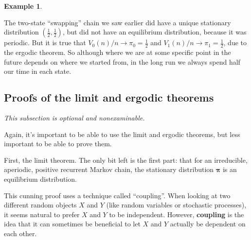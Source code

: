 \documentclass[
  a4paper,
]{article}
\theoremstyle{definition}
\theoremstyle{definition}
\newtheorem{example}{Example}[section]
\theoremstyle{definition}
\theoremstyle{remark}
\begin{document}
\begin{example}
\protect\hypertarget{exm:ergodic-ex2}{}\label{exm:ergodic-ex2}

The two-state ``swapping'' chain we saw earlier did have a unique stationary distribution \((\frac12, \frac12)\), but did not have an equilibrium distribution, because it was periodic. But it is true that \(V_0(n)/n \to \pi_0 = \frac12\) and \(V_1(n)/n \to \pi_1 = \frac12\), due to the ergodic theorem. So although where we are at some specific point in the future depends on where we started from, in the long run we always spend half our time in each state.

\end{example}

\hypertarget{S11-proofs}{%
\subsection{Proofs of the limit and ergodic theorems}\label{S11-proofs}}

\emph{This subsection is optional and nonexaminable.}

Again, it's important to be able to use the limit and ergodic theorems, but less important to be able to prove them.

First, the limit theorem. The only bit left is the first part: that for an irreducible, aperiodic, positive recurrent Markov chain, the stationary distribution \(\boldsymbol\pi\) is an equilibrium distribution.

This cunning proof uses a technique called ``coupling''. When looking at two different random objects \(X\) and \(Y\) (like random variables or stochastic processes), it seems natural to prefer \(X\) and \(Y\) to be independent. However, \textbf{coupling} is the idea that it can sometimes be beneficial to let \(X\) and \(Y\) actually be dependent on each other.
\end{document}
